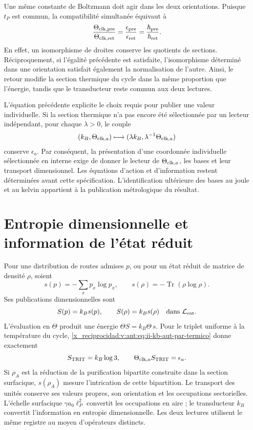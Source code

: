 Une même constante de Boltzmann doit agir dans les deux orientations.
Puisque \(t_P\) est commun, la compatibilité simultanée équivaut à
\begin{equation}
 \frac{\Theta_{{\rm clk},{\rm pre}}}{\Theta_{{\rm clk},{\rm ret}}}
 =\frac{\epsilon_{\rm pre}}{\epsilon_{\rm ret}}
 =\frac{\hbar_{\rm pre}}{\hbar_{\rm ret}}.
 \label{x_reciprocidad:v:ant:eq:ii-kb-aut-orientaciones}
\end{equation}
En effet, un isomorphisme de droites conserve les quotients de sections. Réciproquement, si l'égalité précédente est satisfaite, l'isomorphisme déterminé dans une orientation satisfait également la normalisation de l'autre. Ainsi, le retour modifie la section thermique du cycle dans la même proportion que l'énergie, tandis que le transducteur reste commun aux deux lectures.

L'équation précédente explicite le choix requis pour publier une
valeur individuelle. Si la section thermique n'a pas encore été sélectionnée
par un lecteur indépendant, pour chaque \(\lambda>0\), le couple
\[
 (k_B,\Theta_{{\rm clk},a})
 \longmapsto(\lambda k_B,\lambda^{-1}\Theta_{{\rm clk},a})
\]
conserve \(\epsilon_a\). Par conséquent, la présentation d'une
coordonnée individuelle sélectionnée en interne exige de donner le lecteur de
\(\Theta_{{\rm clk},a}\), les bases et leur transport dimensionnel.
Les équations d'action et d'information restent déterminées avant
cette spécification. L'identification ultérieure des bases au
joule et au kelvin appartient à la publication métrologique du résultat.

\section{Entropie dimensionnelle et information de l'état réduit}

Pour une distribution de routes admises \(p\), ou pour un état réduit de matrice de densité \(\rho\), soient
\[
 s(p)=-\sum_xp_x\log p_x,\qquad
 s(\rho)=-\operatorname{Tr}(\rho\log\rho).
\]
Ses publications dimensionnelles sont
\begin{equation}
 S(p)=k_Bs(p),\qquad S(\rho)=k_Bs(\rho)
 \quad\text{dans }\mathcal L_{\rm ent}.
 \label{x_reciprocidad:v:ant:eq:ii-kb-aut-entropia}
\end{equation}
L'évaluation en \(\Theta\) produit une énergie
\(\Theta S=k_B\Theta\,s\). Pour le triplet uniforme à la température
du cycle, \eqref{x_reciprocidad:v:ant:eq:ii-kb-aut-par-termico} donne exactement
\[
 S_{\rm TRIT}=k_B\log3,\qquad
 \Theta_{{\rm clk},a}S_{\rm TRIT}=\epsilon_a.
\]
Si \(\rho_A\) est la réduction de la purification bipartite construite dans la section surfacique, \(s(\rho_A)\) mesure l'intrication de cette bipartition. Le transport des unités conserve ses valeurs propres, son orientation et les occupations sectorielles. L'échelle surfacique \(\gamma a_0\ell_P^2\) convertit les occupations en aire ; le transducteur \(k_B\) convertit l'information en entropie dimensionnelle. Les deux lectures utilisent le même registre au moyen d'opérateurs distincts.

